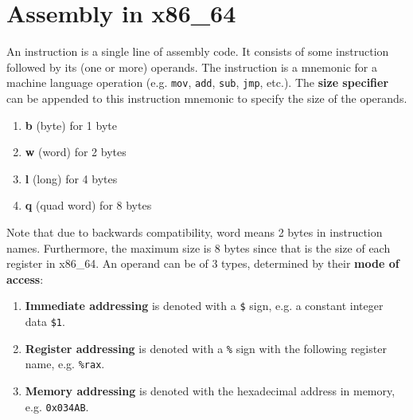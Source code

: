 \documentclass{article}
\begin{document}
\section{Assembly in x86\_64} 

  \begin{definition}[Instruction]
    An instruction is a single line of assembly code. It consists of some instruction followed by its (one or more) operands. The instruction is a mnemonic for a machine language operation (e.g. \texttt{mov}, \texttt{add}, \texttt{sub}, \texttt{jmp}, etc.). The \textbf{size specifier} can be appended to this instruction mnemonic to specify the size of the operands. 
    \begin{enumerate} 
      \item \textbf{b} (byte) for 1 byte 
      \item \textbf{w} (word) for 2 bytes
      \item \textbf{l} (long) for 4 bytes 
      \item \textbf{q} (quad word) for 8 bytes
    \end{enumerate}
    Note that due to backwards compatibility, word means 2 bytes in instruction names. Furthermore, the maximum size is 8 bytes since that is the size of each register in x86\_64. An operand can be of 3 types, determined by their \textbf{mode of access}:
    \begin{enumerate} 
      \item \textbf{Immediate addressing} is denoted with a \texttt{\$} sign, e.g. a constant integer data \texttt{\$1}. 
      \item \textbf{Register addressing} is denoted with a \texttt{\%} sign with the following register name, e.g. \texttt{\%rax}.
      \item \textbf{Memory addressing} is denoted with the hexadecimal address in memory, e.g. \texttt{0x034AB}.
    \end{enumerate}
  \end{definition}
\end{document}
